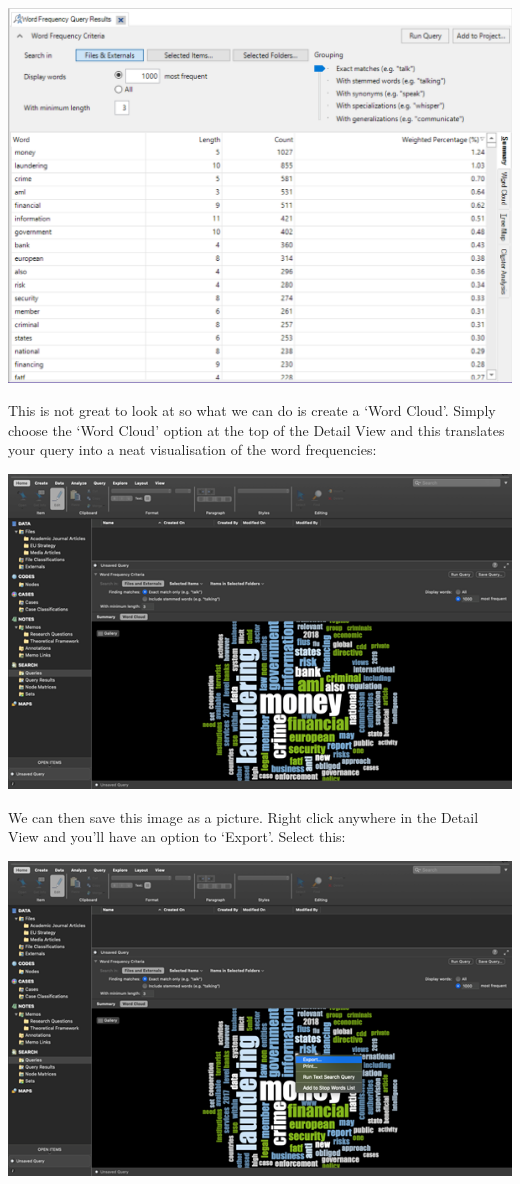 \documentclass[
]{book}
\begin{document}
\includegraphics{imgs/word_freq3.png}

This is not great to look at so what we can do is create a `Word Cloud'. Simply choose the `Word Cloud' option at the top of the Detail View and this translates your query into a neat visualisation of the word frequencies:

\includegraphics{imgs/word_freq2.png}

We can then save this image as a picture. Right click anywhere in the Detail View and you'll have an option to `Export'. Select this:

\includegraphics{imgs/save_cloud.png}
\end{document}
